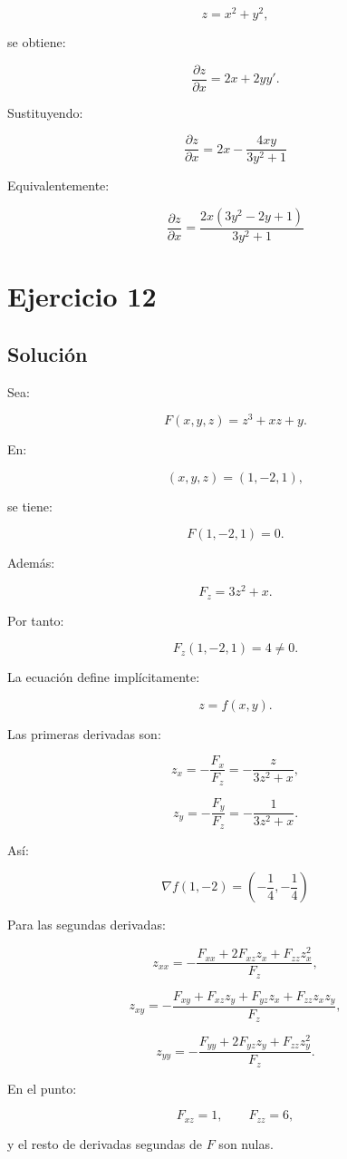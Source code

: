 \documentclass[11pt,a4paper]{article}
\begin{document}
\[
z=x^2+y^2,
\]

se obtiene:

\[
\frac{\partial z}{\partial x}
=
2x+2yy'.
\]

Sustituyendo:

\[
\boxed{
\frac{\partial z}{\partial x}
=
2x
-
\frac{4xy}{3y^2+1}
}
\]

Equivalentemente:

\[
\boxed{
\frac{\partial z}{\partial x}
=
\frac{
2x(3y^2-2y+1)
}{
3y^2+1
}
}
\]

\section{Ejercicio 12}
\subsection{Solución}

Sea:

\[
F(x,y,z)
=
z^3+xz+y.
\]

En:

\[
(x,y,z)=(1,-2,1),
\]

se tiene:

\[
F(1,-2,1)=0.
\]

Además:

\[
F_z
=
3z^2+x.
\]

Por tanto:

\[
F_z(1,-2,1)=4\neq0.
\]

La ecuación define implícitamente:

\[
z=f(x,y).
\]

Las primeras derivadas son:

\[
z_x
=
-\frac{F_x}{F_z}
=
-\frac{z}{3z^2+x},
\]

\[
z_y
=
-\frac{F_y}{F_z}
=
-\frac1{3z^2+x}.
\]

Así:

\[
\boxed{
\nabla f(1,-2)
=
\left(
-\frac14,
-\frac14
\right)
}
\]

Para las segundas derivadas:

\[
z_{xx}
=
-
\frac{
F_{xx}
+
2F_{xz}z_x
+
F_{zz}z_x^2
}{
F_z
},
\]

\[
z_{xy}
=
-
\frac{
F_{xy}
+
F_{xz}z_y
+
F_{yz}z_x
+
F_{zz}z_xz_y
}{
F_z
},
\]

\[
z_{yy}
=
-
\frac{
F_{yy}
+
2F_{yz}z_y
+
F_{zz}z_y^2
}{
F_z
}.
\]

En el punto:

\[
F_{xz}=1,
\qquad
F_{zz}=6,
\]

y el resto de derivadas segundas de \(F\) son nulas.
\end{document}
